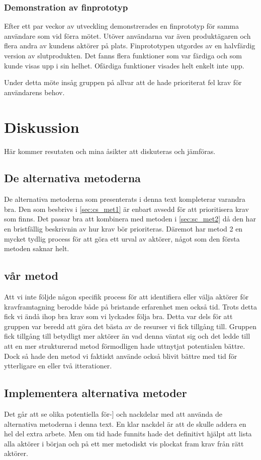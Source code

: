 \subsubsection{Demonstration av finprototyp}
Efter ett par veckor av utveckling demonstrerades en finprototyp för samma användare som vid förra mötet. Utöver användarna var även produktägaren och flera andra av kundens aktörer på plats. Finprototypen utgordes av en halvfärdig version av slutprodukten. Det fanns flera funktioner som var färdiga och som kunde visas upp i sin helhet. Ofärdiga funktioner visades helt enkelt inte upp.

Under detta möte insåg gruppen på allvar att de hade prioriterat fel krav för användarens behov.


\section{Diskussion}
Här kommer resutaten och mina åsikter att diskuteras och jämföras.

\subsection{De alternativa metoderna}
De alternativa metoderna som presenterats i denna text kompleterar varandra bra. Den som besbrivs i \ref{sec:cs_met1} är enbart avsedd för att prioritisera krav som finns. Det passar bra att kombinera med metoden i \ref{sec:sc_met2} då den har en bristfällig beskrivnin av hur krav bör prioriteras. Däremot har metod 2 en mycket tydlig process för att göra ett urval av aktörer, något som den första metoden saknar helt. 

\subsection{vår metod}
Att vi inte följde någon specifik process för att identifiera eller välja aktörer för kravframtagning berodde både på bristande erfarenhet men också tid. Trots detta fick vi ändå ihop bra krav som vi lyckades följa bra. Detta var dels för att gruppen var beredd att göra det bästa av de resurser vi fick tillgång till. Gruppen fick tillgång till betydligt mer aktörer än vad denna väntat sig och det ledde till att en mer strukturerad metod förmodligen hade uttnytjat potentialen bättre. Dock så hade den metod vi faktiskt använde också blivit bättre med tid för ytterligare en eller två itterationer.

\subsection{Implementera alternativa metoder}
Det går att se olika potentiella för-] och nackdelar med att använda de alternativa metoderna i denna text. En klar nackdel är att de skulle addera en hel del extra arbete. Men om tid hade funnits hade det definitivt hjälpt att lista alla aktörer i början och på ett mer metodiskt vis plockat fram krav från rätt aktörer.

